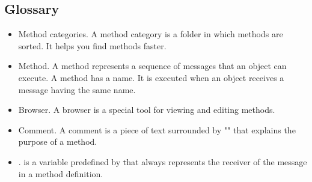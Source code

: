 \subsection*{Glossary}
\begin{itemize}
\item Method categories. A method category is a folder in which methods are sorted. It helps you find methods faster. 
\item Method. A method represents a sequence of messages that an object can execute. A method has a name. It is executed when an object receives a message having the same name. 
\item Browser. A browser is a special tool for viewing and editing methods. 
\item Comment. A comment is a piece of text surrounded by "" that explains the purpose of a method. 
\item \self. \self is a variable predefined by \st that always represents the receiver of the message in a method definition. 
\end{itemize}

\ifx\wholebook\relax\else\fi
